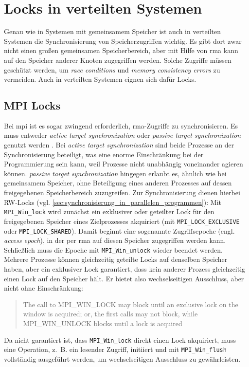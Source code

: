 \chapter{Locks in verteilten Systemen}
\label{ch:dist_locks}

Genau wie in Systemen mit gemeinsamem Speicher
ist auch in verteilten Systemen die Synchronisierung von Speicherzugriffen wichtig.
Es gibt dort zwar nicht einen großen gemeinsamen Speicherbereich,
aber mit Hilfe von \gls{rma} kann auf den Speicher anderer Knoten zugegriffen werden.
Solche Zugriffe müssen geschützt werden,
um \textit{race conditions} und \textit{memory consistency errors} zu vermeiden.
Auch in verteilten Systemen eignen sich dafür Locks.

\section{MPI Locks}
\label{sec:mpi_locks}

Bei \gls{mpi} ist es sogar zwingend erforderlich,
\gls{rma}-Zugriffe zu synchronisieren.
Es muss entweder \textit{active target synchronization} oder \textit{passive target synchronization} genutzt werden \cite[Kapitel 11.5, S. 436]{MPI-3.1}.
Bei \textit{active target synchronization} sind beide Prozesse an der Synchronisierung beteiligt,
was eine enorme Einschränkung bei der Programmierung sein kann,
weil Prozesse nicht unabhängig voneinander agieren können.
\textit{passive target synchronization} hingegen erlaubt es,
ähnlich wie bei gemeinsamem Speicher,
ohne Beteiligung eines anderen Prozesses
auf dessen freigegebenen Speicherbereich zuzugreifen.
Zur Synchronisierung dienen hierbei RW-Locks
(vgl. \autoref{sec:synchronisierung_in_parallelen_programmen}):
Mit \texttt{MPI\_Win\_lock} wird zunächst ein exklusiver oder geteilter Lock
für den freigegebenen Speicher eines Zielprozesses akquiriert
(mit \texttt{MPI\_LOCK\_EXCLUSIVE} oder \texttt{MPI\_LOCK\_SHARED}).
Damit beginnt eine sogenannte Zugriffsepoche (engl. \textit{access epoch}),
in der per \gls{rma} auf diesen Speicher zugegriffen werden kann.
Schließlich muss die Epoche mit \texttt{MPI\_Win\_unlock} wieder beendet werden.
Mehrere Prozesse können gleichzeitig geteilte Locks auf denselben Speicher haben,
aber ein exklusiver Lock garantiert,
dass kein anderer Prozess gleichzeitig einen Lock auf den Speicher hält.
Er bietet also wechselseitigen Ausschluss,
aber nicht ohne Einschränkung:
\foreignblockcquote{english}[Kapitel 11.5.3, S. 448]{MPI-3.1}{%
    The call to
    MPI\_WIN\_LOCK may block until an exclusive lock on the window is acquired; or, the first
    \textelp{} calls may not block, while MPI\_WIN\_UNLOCK blocks until a lock is acquired}
Da nicht garantiert ist,
dass \texttt{MPI\_Win\_lock} direkt einen Lock akquiriert,
muss eine Operation,
z.~B. ein lesender Zugriff,
initiiert und mit \texttt{MPI\_Win\_flush} vollständig ausgeführt werden,
um wechselseitigen Ausschluss zu gewährleisten.

